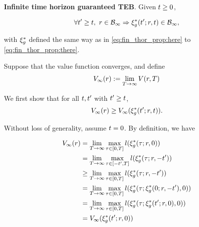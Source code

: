  \begin{prop}
   \label{prop:main}
   \textbf{Infinite time horizon guaranteed TEB}. Given $t \ge 0$,
   
   \begin{equation}
     \forall t' \ge t, ~r\in\mathcal B_\infty \Rightarrow \xi_g^*(t'; r, t) \in \mathcal B_\infty,
   \end{equation}
   
   \noindent with $\xi_g^*$ defined the same way as in \eqref{eq:fin_thor_prop:here} to \eqref{eq:fin_thor_prop:there}.
   
 \end{prop}


\begin{IEEEproof}
  
  Suppose that the value function converges, and define
  \begin{equation}
  \label{eq:conv_valfunc}
  \valfunc_\infty(\rstate) := \lim_{\thor\rightarrow\infty}\valfunc(\rstate, T)
  \end{equation}
  
  We first show that for all $t, t'$ with $t' \ge t$,
  \begin{equation}
  \label{eq:invariant}
  \valfunc_\infty(\rstate) \ge \valfunc_\infty(\rtraj^*(\tvar'; \rstate, \tvar)).
  \end{equation}
  
Without loss of generality, assume $t=0$. By definition, we have

\begin{subequations} \label{eq:inf_thor_steps}
  \begin{align}
  \valfunc_\infty(\rstate) & = \lim_{\thor\rightarrow\infty}\max_{\tau \in [0, \thor]} \errfunc(\rtraj^*(\tau; \rstate, 0)) \label{eq:inf_thor_steps:1}\\
  &= \lim_{\thor\rightarrow\infty}\max_{\tau \in [-\tvar', \thor]} \errfunc(\rtraj^*(\tau; \rstate, -\tvar')) \label{eq:inf_thor_steps:2}\\
  &\ge \lim_{\thor\rightarrow\infty}\max_{\tau \in [0, \thor]} \errfunc(\rtraj^*(\tau; \rstate, -\tvar')) \label{eq:inf_thor_steps:3}\\
  & = \lim_{\thor\rightarrow\infty}\max_{\tau \in [0, \thor]} \errfunc(\rtraj^*(\tau; \rtraj^*(0; \rstate, -\tvar'), 0)) \label{eq:inf_thor_steps:4}\\
  & = \lim_{\thor\rightarrow\infty}\max_{\tau \in [0, \thor]} \errfunc(\rtraj^*(\tau; \rtraj^*(\tvar'; \rstate, 0), 0)) \label{eq:inf_thor_steps:5}\\
  & = \valfunc_\infty(\rtraj^*(\tvar'; \rstate, 0)) \label{eq:inf_thor_steps:6}
  \end{align}
\end{subequations}


\end{IEEEproof}
